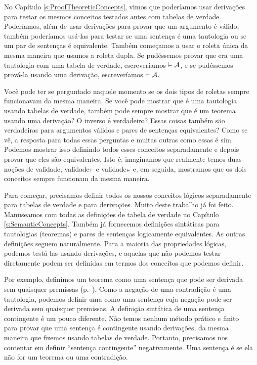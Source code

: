 No Capítulo \ref{s:ProofTheoreticConcepts}, vimos que poder\'iamos usar deriva\c c\~oes para testar os mesmos conceitos testados antes com tabelas de verdade. Poder\'iamos, al\'em de usar deriva\c c\~oes para provar que um argumento \'e v\'alido, tamb\'em poder\'iamos us\'a-las para testar se uma senten\c ca \'e uma tautologia ou se um par de senten\c cas \'e equivalente. Tamb\'em come\c camos a usar o roleta \'unica da mesma maneira que usamos a roleta  dupla.  Se pud\'essemos provar que  era uma tautologia com uma tabela de verdade,  escrever\'iamos  $\vDash \mathcal{A}$, e se pud\'essemos prov\'a-la usando uma deriva\c c\~ao, escrever\'iamos $\vdash \mathcal{A}.$ 

Voc\^e pode ter se perguntado naquele momento se os dois tipos de roletas sempre funcionavam da mesma maneira. Se voc\^e pode mostrar que  \'e uma tautologia usando tabelas de verdade, tamb\'em pode sempre mostrar que \'e um teorema usando uma deriva\c c\~ao? O inverso \'e verdadeiro? Essas coisas tamb\'em s\~ao verdadeiras para argumentos v\'alidos e pares de senten\c cas equivalentes? Como se v\^e, a resposta para todas essas perguntas e muitas outras como essas \'e sim. Podemos mostrar isso definindo todos esses conceitos separadamente e depois provar que eles s\~ao equivalentes.  Isto \'e, imaginamos que realmente temos duas no\c c\~oes de validade, validade$_{\vDash}$ e validade$_{\vdash}$ e, em seguida, mostramos que os dois conceitos sempre funcionam da mesma maneira.


Para come\c car, precisamos definir todos os nossos conceitos l\'ogicos separadamente para tabelas de verdade e  para deriva\c c\~oes. Muito deste trabalho j\'a foi feito.  Manuseamos com todas as defini\c c\~oes de tabela de verdade no Capítulo \ref{s:SemanticConcepts}. Tamb\'em j\'a fornecemos defini\c c\~oes sint\'aticas para tautologias (teoremas) e pares de senten\c cas logicamente equivalentes. As outras defini\c c\~oes seguem naturalmente. Para a maioria das propriedades l\'ogicas, podemos test\'a-las usando deriva\c c\~oes, e aquelas que n\~ao podemos testar diretamente podem ser definidas em termos dos conceitos que podemos definir.

Por exemplo, definimos um teorema como uma senten\c ca que pode ser derivada sem quaisquer premissas (p.~\pageref{def:syntactic_tautology_in_sl}). Como a nega\c c\~ao de uma contradi\c c\~ao \'e uma tautologia, podemos definir uma  \label{def:syntactic_contradiction_in_sl} como uma senten\c ca cuja nega\c c\~ao pode ser derivada sem quaisquer premissas. A defini\c c\~ao sint\'atica de uma senten\c ca contingente \'e um pouco diferente. N\~ao temos nenhum m\'etodo pr\'atico e finito para provar que uma senten\c ca \'e contingente usando deriva\c c\~oes, da mesma maneira que fizemos usando tabelas de verdade. Portanto, precisamos nos contentar em definir ``senten\c ca contingente'' negativamente. Uma senten\c ca \'e  \label{def:syntactically_contingent_in_sl} se ela  n\~ao for um teorema ou uma contradi\c c\~ao. 
 

